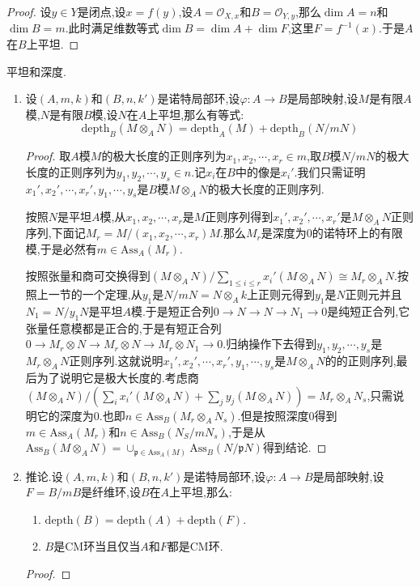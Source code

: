 \begin{enumerate}
\begin{proof}
    	设$y\in Y$是闭点,设$x=f(y)$,设$A=\mathscr{O}_{X,x}$和$B=\mathscr{O}_{Y,y}$,那么$\dim A=n$和$\dim B=m$.此时满足维数等式$\dim B=\dim A+\dim F$,这里$F=f^{-1}(x)$.于是$A$在$B$上平坦.
    \end{proof}
\end{enumerate}

平坦和深度.
\begin{enumerate}
	\item 设$(A,m,k)$和$(B,n,k')$是诺特局部环,设$\varphi:A\to B$是局部映射,设$M$是有限$A$模,$N$是有限$B$模,设$N$在$A$上平坦,那么有等式:
	$$\mathrm{depth}_B(M\otimes_AN)=\mathrm{depth}_A(M)+\mathrm{depth}_B(N/mN)$$
	\begin{proof}
		
		取$A$模$M$的极大长度的正则序列为$x_1,x_2,\cdots,x_r\in m$,取$B$模$N/mN$的极大长度的正则序列为$y_1,y_2,\cdots,y_s\in n$.记$x_i$在$B$中的像是$x_i'$.我们只需证明$x_1',x_2',\cdots,x_r',y_1,\cdots,y_s$是$B$模$M\otimes_AN$的极大长度的正则序列.
		
		按照$N$是平坦$A$模,从$x_1,x_2,\cdots,x_r$是$M$正则序列得到$x_1',x_2',\cdots,x_r'$是$M\otimes_AN$正则序列,下面记$M_r=M/(x_1,x_2,\cdots,x_r)M$.那么$M_r$是深度为0的诺特环上的有限模,于是必然有$m\in\mathrm{Ass}_A(M_r)$.
		
		按照张量和商可交换得到$(M\otimes_AN)/\sum_{1\le i\le r}x_i'(M\otimes_AN)\cong M_r\otimes_AN$.按照上一节的一个定理,从$y_1$是$N/mN=N\otimes_Ak$上正则元得到$y_1$是$N$正则元并且$N_1=N/y_1N$是平坦$A$模.于是短正合列$0\to N\to N\to N_1\to0$是纯短正合列,它张量任意模都是正合的,于是有短正合列$0\to M_r\otimes N\to M_r\otimes N\to M_r\otimes N_1\to0$.归纳操作下去得到$y_1,y_2,\cdots,y_s$是$M_r\otimes_AN$正则序列.这就说明$x_1',x_2',\cdots,x_r',y_1,\cdots,y_s$是$M\otimes_AN$的的正则序列,最后为了说明它是极大长度的.考虑商$(M\otimes_AN)/(\sum_ix_i'(M\otimes_AN)+\sum_jy_j(M\otimes_AN))=M_r\otimes_AN_s$,只需说明它的深度为0.也即$n\in\mathrm{Ass}_B(M_r\otimes_AN_s)$.但是按照深度0得到$m\in\mathrm{Ass}_A(M_r)$和$n\in\mathrm{Ass}_B(N_S/mN_s)$,于是从$\mathrm{Ass}_B(M\otimes_AN)=\cup_{\mathfrak{p}\in\mathrm{Ass}_A(M)}\mathrm{Ass}_B(N/\mathfrak{p}N)$得到结论.
	\end{proof}
    \item 推论.设$(A,m,k)$和$(B,n,k')$是诺特局部环,设$\varphi:A\to B$是局部映射,设$F=B/mB$是纤维环,设$B$在$A$上平坦,那么:
    \begin{enumerate}
    	\item $\mathrm{depth}(B)=\mathrm{depth}(A)+\mathrm{depth}(F)$.
    	\item $B$是CM环当且仅当$A$和$F$都是CM环.
    \end{enumerate}
    \begin{proof}
    	

\end{proof}
\end{enumerate}
